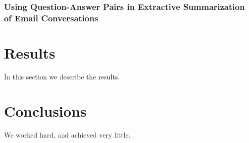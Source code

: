 \documentclass[12pt]{article}
\begin{document}
\subsubsection{Using Question-Answer Pairs in Extractive Summarization of Email Conversations}

\section{Results}\label{results}
In this section we describe the results.

\section{Conclusions}\label{conclusions}
We worked hard, and achieved very little.



\end{document}
